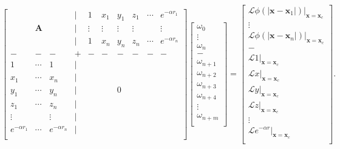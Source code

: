 \begin{equation}
\begin{bmatrix}
    & & & |  & 1 & x_1 & y_1 & z_1 & \cdots &  e^{-\alpha r_1}\\
    & \mathbf{A} & & |  & \vdots & \vdots & \vdots & \vdots & & \vdots\\
    & & & |  & 1 & x_n & y_n & z_n & \cdots &  e^{-\alpha r_n}\\
     - & - &  - & +  & - & - & - & - & - & -\\
     1 & \cdots & 1 & |  &  &  &  &  &  & \\
     x_1 & \cdots & x_n & |  &  &  &  &  &  & \\
     y_1 & \cdots & y_n & |  &  &  & 0 &  &  & \\
     z_1 & \cdots & z_n & |  &  &  &  &  &  & \\
     \vdots &  & \vdots & |  &  &  &  &  &  & \\
     e^{-\alpha r_1} & \cdots & e^{-\alpha r_n} & |  &  &  &  &  &  & \\ 
\end{bmatrix}
\begin{bmatrix}
    \omega_{0} \\
    \vdots  \\
    \omega_{n}\\
    -\\
    \omega_{n+1}\\
    \omega_{n+2}\\
    \omega_{n+3}\\
    \omega_{n+4}\\
    \vdots\\
    \omega_{n+m}\\
\end{bmatrix}
= 
\begin{bmatrix}
    \mathcal{L}\phi(|\mathbf{x}-\mathbf{x}_1|) |_{\mathbf{x}=\mathbf{x}_c} \\
    \vdots  \\
    \mathcal{L}\phi(|\mathbf{x}-\mathbf{x}_n|) |_{\mathbf{x}=\mathbf{x}_c} \\
    -\\
    \mathcal{L}1 |_{\mathbf{x}=\mathbf{x}_c}\\
    \mathcal{L}x |_{\mathbf{x}=\mathbf{x}_c}\\
    \mathcal{L}y |_{\mathbf{x}=\mathbf{x}_c}\\
    \mathcal{L}z |_{\mathbf{x}=\mathbf{x}_c}\\
    \vdots\\
    \mathcal{L} e^{-\alpha r} |_{\mathbf{x}=\mathbf{x}_c}\\
\end{bmatrix} .
\label{eq:rbf_weights}
\end{equation}
